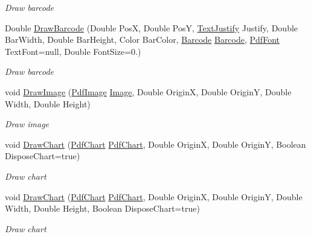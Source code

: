 \begin{DoxyCompactItemize}
\begin{DoxyCompactList}\small\item\em Draw barcode \end{DoxyCompactList}\item 
Double \hyperlink{class_pdf_file_writer_1_1_pdf_contents_a14be42f85e32241fbab4ce45ddc57bc8}{Draw\+Barcode} (Double PosX, Double PosY, \hyperlink{namespace_pdf_file_writer_a3991bfacc8c7be240452dd24ec817157}{Text\+Justify} Justify, Double Bar\+Width, Double Bar\+Height, Color Bar\+Color, \hyperlink{class_pdf_file_writer_1_1_barcode}{Barcode} \hyperlink{class_pdf_file_writer_1_1_barcode}{Barcode}, \hyperlink{class_pdf_file_writer_1_1_pdf_font}{Pdf\+Font} Text\+Font=null, Double Font\+Size=0.)
\begin{DoxyCompactList}\small\item\em Draw barcode \end{DoxyCompactList}\item 
void \hyperlink{class_pdf_file_writer_1_1_pdf_contents_a85ca90130298ef8939cf597c0a07d40b}{Draw\+Image} (\hyperlink{class_pdf_file_writer_1_1_pdf_image}{Pdf\+Image} \hyperlink{namespace_pdf_file_writer_a45e52c090a4d8e1333577773ec0bac4aabe53a0541a6d36f6ecb879fa2c584b08}{Image}, Double OriginX, Double OriginY, Double Width, Double Height)
\begin{DoxyCompactList}\small\item\em Draw image \end{DoxyCompactList}\item 
void \hyperlink{class_pdf_file_writer_1_1_pdf_contents_af8c3c1f8357bcb835b17dc49d91b630e}{Draw\+Chart} (\hyperlink{class_pdf_file_writer_1_1_pdf_chart}{Pdf\+Chart} \hyperlink{class_pdf_file_writer_1_1_pdf_chart}{Pdf\+Chart}, Double OriginX, Double OriginY, Boolean Dispose\+Chart=true)
\begin{DoxyCompactList}\small\item\em Draw chart \end{DoxyCompactList}\item 
void \hyperlink{class_pdf_file_writer_1_1_pdf_contents_a6fd896853a7655c39d2a7df732290356}{Draw\+Chart} (\hyperlink{class_pdf_file_writer_1_1_pdf_chart}{Pdf\+Chart} \hyperlink{class_pdf_file_writer_1_1_pdf_chart}{Pdf\+Chart}, Double OriginX, Double OriginY, Double Width, Double Height, Boolean Dispose\+Chart=true)
\begin{DoxyCompactList}\small\item\em Draw chart \end{DoxyCompactList}\item 

\end{DoxyCompactItemize}
